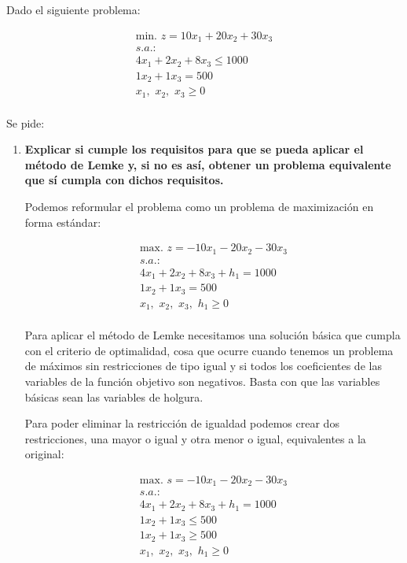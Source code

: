 Dado el siguiente problema:

\begin{equation}
\begin{split}
\mbox{min. } z = 10x_1 + 20x_2 + 30x_3\\
s.a.:\\
4x_1 + 2x_2 + 8x_3 \leq 1000\\
1x_2 + 1x_3 = 500\\
x_1,\,\,x_2,\,\,x_3\geq 0\\
\end{split}
\end{equation}

Se pide:
\begin{enumerate}
    \item \textbf{Explicar si cumple los requisitos para que se pueda aplicar el método de Lemke y, si no es así, obtener un problema equivalente que sí cumpla con dichos requisitos.}

    Podemos reformular el problema como un problema de maximización en forma estándar:

    \begin{equation}
    \begin{split}
    \mbox{max. } z = -10x_1 - 20x_2 - 30x_3\\
    s.a.:\\
    4x_1 + 2x_2 + 8x_3 + h_1 = 1000\\
    1x_2 + 1x_3 = 500\\
    x_1,\,\,x_2,\,\,x_3,\,\,h_1\geq 0\\
    \end{split}
    \end{equation}

    Para aplicar el método de Lemke necesitamos una solución básica que cumpla con el criterio de optimalidad, cosa que ocurre cuando tenemos un problema de máximos sin restricciones de tipo igual y si todos los coeficientes de las variables de la función objetivo son negativos. Basta con que las variables básicas sean las variables de holgura.

    Para poder eliminar la restricción de igualdad podemos crear dos restricciones, una mayor o igual y otra menor o igual, equivalentes a la original:

    \begin{equation}
    \begin{split}
    \mbox{max. } s = -10x_1 - 20x_2 - 30x_3\\
    s.a.:\\
    4x_1 + 2x_2 + 8x_3 + h_1 = 1000\\
    1x_2 + 1x_3 \leq 500\\
    1x_2 + 1x_3 \geq 500\\
    x_1,\,\,x_2,\,\,x_3,\,\,h_1\geq 0\\
    \end{split}
    \end{equation}


\end{enumerate}

